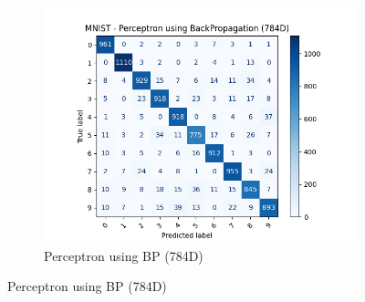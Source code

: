 \begin{figure}[htbp]
\begin{subfigure}[b]{0.33\linewidth}
        \end{subfigure}
        \begin{subfigure}[b]{0.33\linewidth}
                \centering
                \includegraphics[width=1\linewidth]{../source/mnist/pictures/perceptronBP-confusion-784d.png}
                \caption{Perceptron using BP (784D)}
                \label{fig:mnist-confusion-pbp-784}
        \end{subfigure}


\end{figure}
